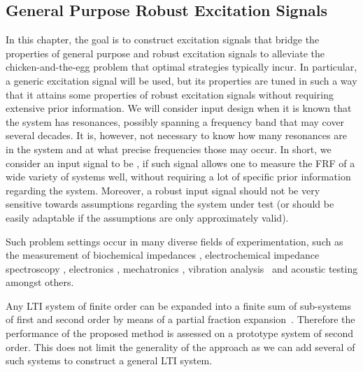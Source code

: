 \subsection{General Purpose Robust Excitation Signals}
\label{sec:excitation:intro:approach}
In this chapter, the goal is to construct excitation signals that bridge the properties of general purpose and robust excitation signals to alleviate the chicken-and-the-egg problem that optimal strategies typically incur.
In particular, a generic excitation signal will be used, but its properties are tuned in such a way that it attains some properties of robust excitation signals without requiring extensive prior information.
We will consider input design when it is known that the system has resonances, possibly spanning a frequency band that may cover several decades. 
It is, however, not necessary to know how many resonances are in the system and at what precise frequencies those may occur.
In short, we consider an input signal to be , if such signal allows one to measure the \gls{FRF} of a wide variety of systems well, without requiring a lot of specific prior information regarding the system.
Moreover, a robust input signal should not be very sensitive towards assumptions regarding the system under test (or should be easily adaptable if the assumptions are only approximately valid).

Such problem settings occur in many diverse fields of experimentation, such as the measurement of biochemical impedances \citep{Bragos2001,Sanchez2011}, electrochemical impedance spectroscopy \citep{Niedostatkiewicz2009,VanGheem2004,Breugelmans2010}, electronics \citep{Munir2011}, mechatronics \citep{Steinbuch1998,Oomen2016}, vibration analysis~\citep{Karnopp1995,Voorhoeve2015SYSID} and acoustic testing \citep{GarciaLopez2014,DAmico2014} amongst others. 

  Any \gls{LTI} system of finite order can be expanded into a finite sum of sub-systems of first and second order by means of a partial fraction expansion~\citep{Oppenheim1996}.
  Therefore the performance of the proposed method is assessed on a prototype system of second order.
  This does not limit the generality of the approach as we can add several of such systems to construct a general \gls{LTI} system.
  
